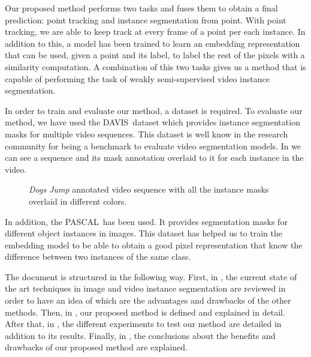 Our proposed method performs two tasks and fuses them to obtain a final prediction: point tracking and instance segmentation from point.
With point tracking, we are able to keep track at every frame of a point per each instance.
In addition to this, a model has been trained to learn an embedding representation that can be used, given a point and its label, to label the rest of the pixels with a similarity computation.
A combination of this two tasks gives us a method that is capable of performing the task of weakly semi-supervised video instance segmentation.

In order to train and evaluate our method, a dataset is required.
To evaluate our method, we have used the DAVIS~\davisboth dataset which provides instance segmentation masks for multiple video sequences.
This dataset is well know in the research community for being a benchmark to evaluate video segmentation models.
In  we can see a sequence and its mask annotation overlaid to it for each instance in the video.

\begin{figure}[h]
  \centering
  \caption{\textit{Dogs Jump} annotated video sequence with all the instance masks overlaid in different colors. }
  \label{fig:intro:davis}
\end{figure}

In addition, the PASCAL~\pascal has been used.
It provides segmentation masks for different object instances in images.
This dataset has helped us to train the embedding model to be able to obtain a good pixel representation that know the difference between two instances of the same class.

The document is structured in the following way. First, in , the current state of the art techniques in image and video instance segmentation are reviewed in order to have an idea of which are the advantages and drawbacks of the other methods.
Then, in , our proposed method is defined and explained in detail.
After that, in , the different experiments to test our method are detailed in addition to its results.
Finally, in , the conclusions about the benefits and drawbacks of our proposed method are explained.
